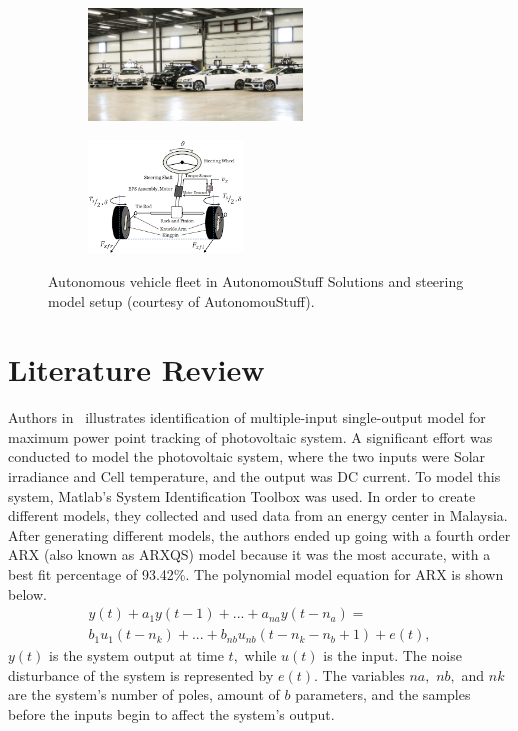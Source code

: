 \documentclass[journal,twoside,web]{ieeecolor}
\begin{document}
\vspace*{12pt}

\begin{figure}[htbp]
  \centering
  \begin{subfigure}[b]{0.48\linewidth}
    \centering
    \includegraphics[height=3cm]{figs/img/autonomousVehiclesAStuff}
    \caption{}
    \label{fig:fleet}
  \end{subfigure}
  \begin{subfigure}[b]{0.48\linewidth}
    \centering
    \includegraphics[height=3cm]{figs/img/autonomousVehiclesSteering}
    \caption{}
    \label{fig:steerOverview}
  \end{subfigure}
  \caption{ Autonomous vehicle fleet in AutonomouStuff Solutions and  steering model setup (courtesy of AutonomouStuff). }
  \label{fig:AstuffFleetSteeringSetup}
\end{figure}


 \section{Literature Review}

 Authors in~\cite{Hussain2011} illustrates identification of multiple-input
 single-output model for maximum power point tracking of photovoltaic system. A
 significant effort was conducted to model the photovoltaic system, where the two inputs were
 Solar irradiance and Cell temperature, and the output was DC current. To model
 this system, Matlab’s System Identification Toolbox was used. In order to
 create different models, they collected and used data from an energy center in
 Malaysia. After generating different models, the authors ended up going with a
 fourth order ARX (also known as ARXQS) model because it was the most accurate,
 with a best fit percentage of 93.42\%. The polynomial model equation for ARX is
 shown below. %
 \begin{multline*}
   y(t) + a_1y(t - 1) +...+a_{na}y(t - n_{a}) = \\
   b_{1}u_{1}(t-n_{k})+...+b_{nb}u_{nb}(t - n_{k}-n_{b}+1) + e(t), 
 \end{multline*}
% 
$y(t)$ is the system output at time $t,$ while $u(t)$ is the input. The noise disturbance of the system is represented by $e(t).$ The variables $na,$ $nb,$ and $nk$ are the system’s number of poles, amount of $b$ parameters, and the samples before the inputs begin to affect the system’s output.
\end{document}

